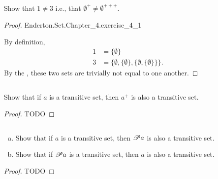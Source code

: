 \documentclass{report}
\begin{document}
\subsection{}%

Show that $1 \neq 3$ i.e., that $\emptyset^+ \neq \emptyset^{+++}$.

\begin{proof}

    {Enderton.Set.Chapter\_4.exercise\_4\_1}

  By definition,
    \begin{align*}
      1 & = \{\emptyset\} \\
      3 & = \{\emptyset, \{\emptyset\}, \{\emptyset, \{\emptyset\}\}\}.
    \end{align*}
  By the , these two sets are trivially not
    equal to one another.

\end{proof}

\subsection{}%

Show that if $a$ is a transitive set, then $a^+$ is also a transitive set.

\begin{proof}

  TODO

\end{proof}

\subsection{}%

\begin{enumerate}[(a)]
  \item Show that if $a$ is a transitive set, then $\mathscr{P}a$ is also a
    transitive set.
  \item Show that if $\mathscr{P}a$ is a transitive set, then $a$ is also a
    transitive set.
\end{enumerate}

\begin{proof}

  TODO

\end{proof}
\end{document}
